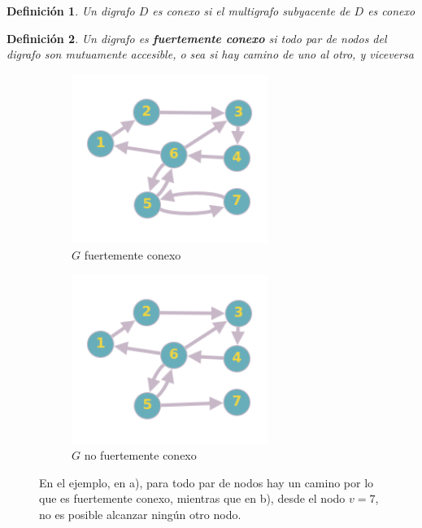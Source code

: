 \documentclass[a4paper,1pt]{report}
\newtheorem*{dfn}{Definición}
\begin{document}
\begin{dfn}
 Un digrafo $D$ es conexo si el multigrafo subyacente de $D$ es conexo
\end{dfn}

\begin{dfn}
 Un digrafo es \textbf{fuertemente conexo} si todo par de nodos del digrafo son mutuamente accesible, o sea si hay camino de uno al otro, y viceversa
\end{dfn}

\begin{figure}[H]
    \centering
    \begin{subfigure}[b]{0.45\textwidth}
        \centering
        \includegraphics[width=0.7\textwidth]{figures8/digrafo.png}
        \caption{$G$ fuertemente conexo}
    \end{subfigure} 
        \begin{subfigure}[b]{0.45\textwidth}
        \centering
        \includegraphics[width=0.7\textwidth]{figures8/NoFConex.png}
        \caption{$G$ no fuertemente conexo}
         \end{subfigure} 

        \caption{En el ejemplo, en a), para todo par de nodos hay un camino por lo que es fuertemente conexo, mientras que en b), desde el nodo $v =7$, no es posible alcanzar ning\'un otro nodo.}
\end{figure} 
\end{document}
